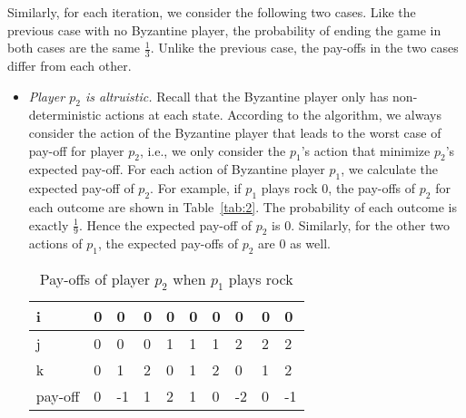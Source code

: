 Similarly, for each iteration, we consider the following two cases.
Like the previous case with no Byzantine player, the probability of ending the game in both cases are the same $\frac{1}{3}$. Unlike the previous case, the
pay-offs in the two cases differ from each other.
\begin{itemize}
	\item {\textit {Player $p_2$ is altruistic.}} Recall that the Byzantine player only has non-deterministic actions at each state. According to the algorithm, we always consider the action of the Byzantine player that leads to the worst case of pay-off for player $p_2$, i.e., we only consider the $p_1$'s action that minimize $p_2$'s expected pay-off.%
For each action of Byzantine player $p_1$, we calculate the expected pay-off of $p_2$. For example, if $p_1$ plays rock $0$, the pay-offs of $p_2$ for each outcome are shown in Table~\ref{tab:2}. The probability of each outcome is exactly $\frac{1}{9}$. Hence the expected pay-off of $p_2$ is $0$. Similarly, for the other two actions of $p_1$, the expected pay-offs of $p_2$ are $0$ as well.
	
	\begin{table}[]
		\centering
		\caption{Pay-offs of player $p_2$ when $p_1$ plays rock}\label{tab:2}
		\label{tab:hbh}
		\begin{tabular}{|l|l|l|l|l|l|l|l|l|l|}
		\hline
		i & 0 & 0 & 0 & 0 & 0 & 0 & 0 & 0 & 0\\
		\hline
		j & 0 & 0 & 0 & 1 & 1 & 1 & 2 & 2 & 2\\	
		\hline
		k & 0 & 1 & 2 & 0 & 1 & 2 & 0 & 1 & 2\\
		\hline
		pay-off & 0 & -1 & 1 & 2 & 1 & 0 & -2 & 0 & -1 \\
			\hline
		\end{tabular}
	\end{table}
	

\end{itemize}
